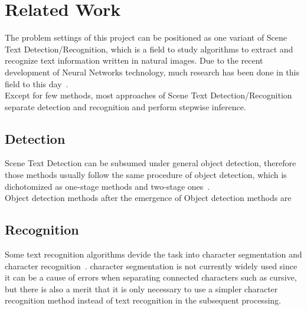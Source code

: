 \section{Related Work}

The problem settings of this project can be positioned as one variant of Scene Text Detection/Recognition, which
is a field to study algorithms to extract and recognize text information written in natural images.
Due to the recent development of Neural Networks technology,
much research has been done in this field to this day~\cite{long2018scene}.\\
Except for few methods\cite{liu2018fots}\cite{lyu2018mask}, most approaches of Scene Text Detection/Recognition
separate detection and recognition and perform stepwise inference.

\subsection{Detection}

Scene Text Detection can be subsumed under general object detection, therefore those methods usually follow
the same procedure of object detection, which is dichotomized as one-stage methods and two-stage ones~\cite{liu2018deep}.\\

Object detection methods after the emergence of Object detection methods are

\subsection{Recognition}

Some text recognition algorithms devide the task into character segmentation and character recognition~\cite{bissacco2013photoocr}\cite{phan2011gradient}.
character segmentation is not currently widely used
since it can be a cause of errors when separating connected characters such as cursive,
but there is also a merit that it is only necessary to use a simpler character recognition method
instead of text recognition in the subsequent processing.
